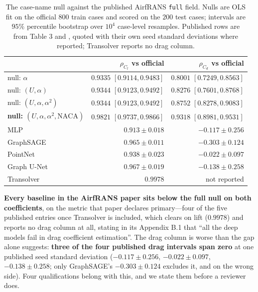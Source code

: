 \begin{table}[t]
\centering
\small
\caption{The case-name null against the published AirfRANS \texttt{full} field.
Nulls are OLS fit on the official $800$ train cases and scored on the $200$ test
cases; intervals are $95\%$ percentile bootstrap over $10^4$ case-level resamples.
Published rows are from \citet{bonnet2022airfrans} Table 3 and
\citet{wu2024transolver}, quoted with their own seed standard deviations where reported;
Transolver reports no drag column.}
\label{tab:covariate}
\begin{tabular}{l r r}
\toprule
 & $\rho_{C_l}$ vs official & $\rho_{C_d}$ vs official \\
\midrule
null: $\alpha$ & $0.9335$ $[0.9114,0.9483]$ & $0.8001$ $[0.7249,0.8563]$ \\
null: $(U,\alpha)$ & $0.9344$ $[0.9123,0.9492]$ & $0.8276$ $[0.7601,0.8768]$ \\
null: $(U,\alpha,\alpha^2)$ & $0.9344$ $[0.9123,0.9492]$ & $0.8752$ $[0.8278,0.9083]$ \\
\textbf{null: $(U,\alpha,\alpha^2,\text{NACA})$} & $\mathbf{0.9821}$ $[0.9737,0.9866]$ & $\mathbf{0.9318}$ $[0.8981,0.9531]$ \\
\midrule
MLP & $0.913{\pm}0.018$ & $-0.117{\pm}0.256$ \\
GraphSAGE & $0.965{\pm}0.011$ & $-0.303{\pm}0.124$ \\
PointNet & $0.938{\pm}0.023$ & $-0.022{\pm}0.097$ \\
Graph U-Net & $0.967{\pm}0.019$ & $-0.138{\pm}0.258$ \\
Transolver & $0.9978$ & not reported \\
\bottomrule
\end{tabular}
\end{table}

\textbf{Every baseline in the AirfRANS paper sits below the full null on both
coefficients}, on the metric that paper declares primary---four of the five
published entries once Transolver is included, which clears on lift ($0.9978$) and
reports no drag column at all, stating in its Appendix B.1 that ``all the deep models fail
in drag coefficient estimation''. The drag column is worse than the gap alone suggests:
\textbf{three of the four published drag intervals span zero} at one published seed
standard deviation ($-0.117{\pm}0.256$, $-0.022{\pm}0.097$, $-0.138{\pm}0.258$; only
GraphSAGE's $-0.303{\pm}0.124$ excludes it, and on the wrong side). Four qualifications
belong with this, and we state them before a reviewer does.

